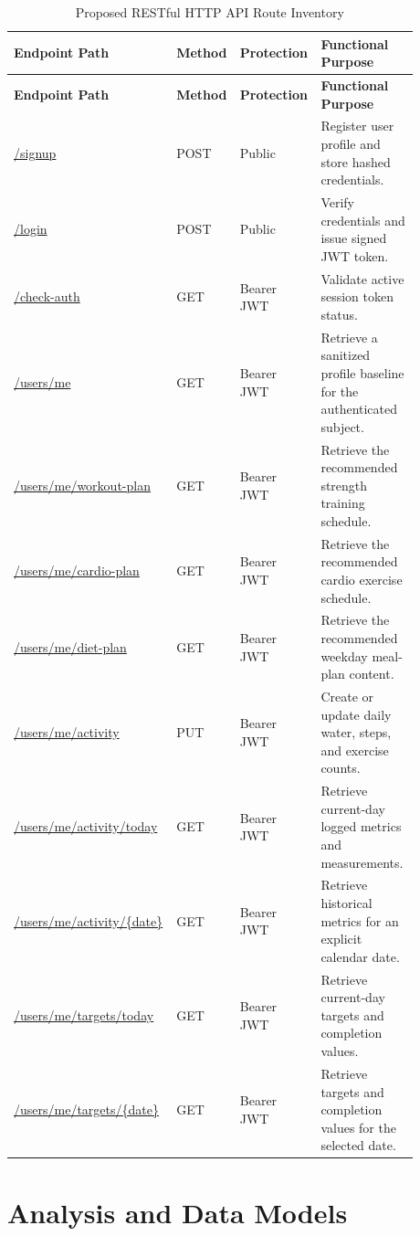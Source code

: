 \documentclass[11pt,a4paper]{report}
\begin{document}
\small
\begin{longtable}{P{0.38\linewidth}P{0.10\linewidth}P{0.16\linewidth}P{0.24\linewidth}}
\caption{Proposed RESTful HTTP API Route Inventory}\label{tab:routes}\\
\toprule
\textbf{Endpoint Path} & \textbf{Method} & \textbf{Protection} & \textbf{Functional Purpose} \\
\midrule
\endfirsthead
\toprule
\textbf{Endpoint Path} & \textbf{Method} & \textbf{Protection} & \textbf{Functional Purpose} \\
\midrule
\endhead
\url{/signup} & POST & Public & Register user profile and store hashed credentials. \\
\url{/login} & POST & Public & Verify credentials and issue signed JWT token. \\
\url{/check-auth} & GET & Bearer JWT & Validate active session token status. \\
\url{/users/me} & GET & Bearer JWT & Retrieve a sanitized profile baseline for the authenticated subject. \\
\url{/users/me/workout-plan} & GET & Bearer JWT & Retrieve the recommended strength training schedule. \\
\url{/users/me/cardio-plan} & GET & Bearer JWT & Retrieve the recommended cardio exercise schedule. \\
\url{/users/me/diet-plan} & GET & Bearer JWT & Retrieve the recommended weekday meal-plan content. \\
\url{/users/me/activity} & PUT & Bearer JWT & Create or update daily water, steps, and exercise counts. \\
\url{/users/me/activity/today} & GET & Bearer JWT & Retrieve current-day logged metrics and measurements. \\
\url{/users/me/activity/\{date\}} & GET & Bearer JWT & Retrieve historical metrics for an explicit calendar date. \\
\url{/users/me/targets/today} & GET & Bearer JWT & Retrieve current-day targets and completion values. \\
\url{/users/me/targets/\{date\}} & GET & Bearer JWT & Retrieve targets and completion values for the selected date. \\
\bottomrule
\end{longtable}

\chapter{Analysis and Data Models}
\end{document}
